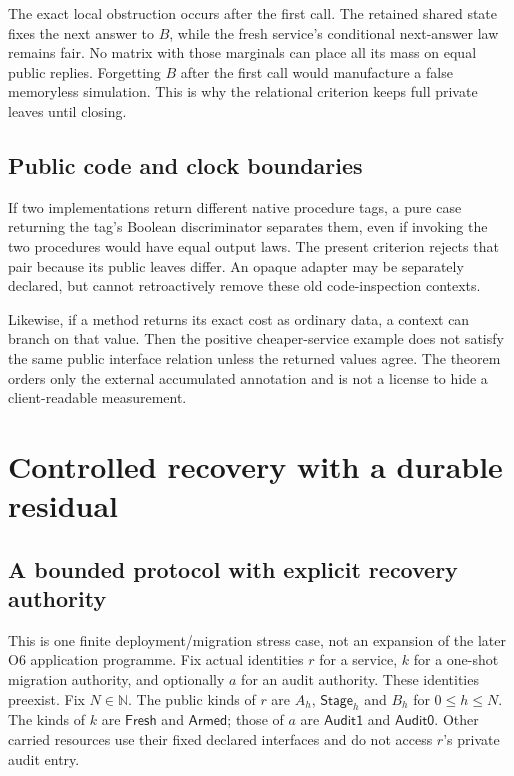 \documentclass[11pt,a4paper]{article}
\theoremstyle{definition}
\begin{document}
The exact local obstruction occurs after the first call. The retained
shared state fixes the next answer to $B$, while the fresh service's
conditional next-answer law remains fair. No matrix with those marginals
can place all its mass on equal public replies. Forgetting $B$ after the
first call would manufacture a false memoryless simulation. This is why
the relational criterion keeps full private leaves until closing.

\subsection{Public code and clock boundaries}
If two implementations return different native procedure tags, a pure
case returning the tag's Boolean discriminator separates them, even if
invoking the two procedures would have equal output laws. The present
criterion rejects that pair because its public leaves differ. An opaque
adapter may be separately declared, but cannot retroactively remove
these old code-inspection contexts.

Likewise, if a method returns its exact cost as ordinary data, a context
can branch on that value. Then the positive cheaper-service example does
not satisfy the same public interface relation unless the returned values
agree. The theorem orders only the external accumulated annotation and
is not a license to hide a client-readable measurement.

\section{Controlled recovery with a durable residual}\label{sec:recovery}

\subsection{A bounded protocol with explicit recovery authority}
This is one finite deployment/migration stress case, not an expansion of
the later O6 application programme. Fix actual identities $r$ for a
service, $k$ for a one-shot migration authority, and optionally $a$ for
an audit authority. These identities preexist. Fix $N\in\mathbb N$.
The public kinds of $r$ are $A_h$, $\mathsf{Stage}_h$ and $B_h$ for
$0\le h\le N$. The kinds of $k$ are $\mathsf{Fresh}$ and
$\mathsf{Armed}$; those of $a$ are $\mathsf{Audit1}$ and
$\mathsf{Audit0}$. Other carried resources use their fixed declared
interfaces and do not access $r$'s private audit entry.
\end{document}
